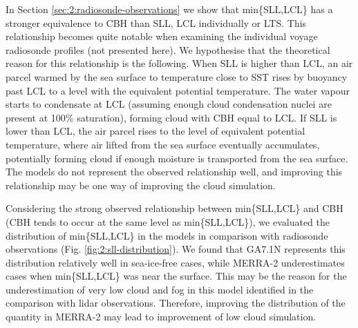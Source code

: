 In Section \ref{sec:2:radiosonde-observations} we show that min\{SLL,LCL\} has a
stronger equivalence to CBH than SLL, LCL individually or LTS.  This
relationship becomes quite notable when examining the individual voyage
radiosonde profiles (not presented here). We hypothesise that the theoretical
reason for this relationship is the following. When SLL is higher than LCL, an
air parcel warmed by the sea surface to temperature close to SST rises by
buoyancy past LCL to a level with the equivalent potential temperature.  The
water vapour starts to condensate at LCL (assuming enough cloud condensation
nuclei are present at 100\% saturation), forming cloud with CBH equal to LCL.
If SLL is lower than LCL, the air parcel rises to the level of equivalent
potential temperature, where air lifted from the sea surface eventually
accumulates, potentially forming cloud if enough moisture is transported from
the sea surface. The models do not represent the observed relationship well,
and improving this relationship may be one way of improving the cloud
simulation.

Considering the strong observed relationship between min\{SLL,LCL\} and CBH
(CBH tends to occur at the same level as min\{SLL,LCL\}), we evaluated the
distribution of min\{SLL,LCL\} in the models in comparison with radiosonde
observations (Fig. \ref{fig:2:sll-distribution}). We found that GA7.1N
represents this distribution relatively well in sea-ice-free cases, while
MERRA-2 underestimates cases when min\{SLL,LCL\} was near the surface. This may
be the reason for the underestimation of very low cloud and fog in this model
identified in the comparison with lidar observations. Therefore, improving the
distribution of the quantity in MERRA-2 may lead to improvement of low cloud
simulation.

